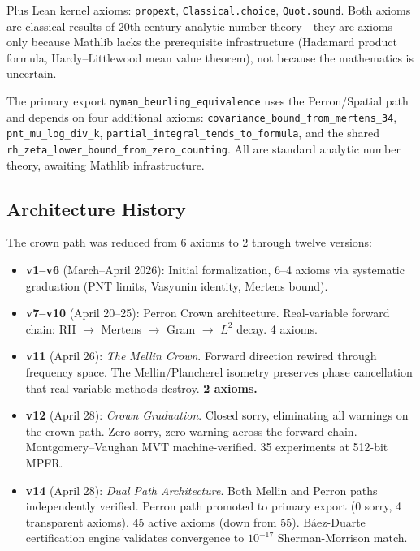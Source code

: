 \documentclass[12pt,a4paper]{article}
\begin{document}
\noindent Plus Lean kernel axioms: \texttt{propext}, \texttt{Classical.choice}, \texttt{Quot.sound}.
Both axioms are classical results of 20th-century analytic number theory---they are
axioms only because Mathlib lacks the prerequisite infrastructure (Hadamard product
formula, Hardy--Littlewood mean value theorem), not because the mathematics is uncertain.

The primary export \texttt{nyman\_beurling\_equivalence} uses the Perron/Spatial
path and depends on four additional axioms:
\texttt{covariance\_bound\_from\_mertens\_34},
\texttt{pnt\_mu\_log\_div\_k},
\texttt{partial\_integral\_tends\_to\_formula}, and
the shared \texttt{rh\_zeta\_lower\_bound\_from\_zero\_counting}.
All are standard analytic number theory, awaiting Mathlib infrastructure.

\subsection*{Architecture History}

The crown path was reduced from 6 axioms to 2 through twelve versions:

\begin{itemize}
\item \textbf{v1--v6} (March--April 2026): Initial formalization, 6--4 axioms via
  systematic graduation (PNT limits, Vasyunin identity, Mertens bound).
\item \textbf{v7--v10} (April 20--25): Perron Crown architecture. Real-variable
  forward chain: RH $\to$ Mertens $\to$ Gram $\to$ $L^2$ decay. 4 axioms.
\item \textbf{v11} (April 26): \emph{The Mellin Crown}. Forward direction rewired
  through frequency space. The Mellin/Plancherel isometry preserves phase
  cancellation that real-variable methods destroy. \textbf{2 axioms.}
\item \textbf{v12} (April 28): \emph{Crown Graduation}. Closed
   sorry, eliminating all warnings on the
  crown path. Zero sorry, zero warning across the forward chain.
  Montgomery--Vaughan MVT machine-verified. 35 experiments at 512-bit MPFR.
\item \textbf{v14} (April 28): \emph{Dual Path Architecture}. Both Mellin
  and Perron paths independently verified. Perron path promoted to primary
  export (0 sorry, 4 transparent axioms). 45 active axioms (down from 55).
  B\'aez-Duarte certification engine validates convergence to $10^{-17}$
  Sherman-Morrison match.
\end{itemize}
\end{document}
